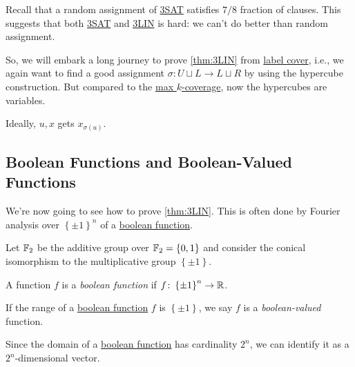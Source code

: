 \begin{note}
	Recall that a random assignment of \hyperref[prb:max-3SAT]{3SAT} satisfies \(7 / 8\) fraction of clauses. This suggests that both \hyperref[prb:max-3SAT]{3SAT} and \hyperref[prb:max-3LIN]{3LIN} is hard: we can't do better than random assignment.
\end{note}

So, we will embark a long journey to prove \autoref{thm:3LIN} from \hyperref[prb:label-cover]{label cover}, i.e., we again want to find a good assignment \(\sigma \colon U \sqcup L \to L \sqcup R\) by using the hypercube construction. But compared to the \hyperref[prb:max-k-coverage]{max \(k\)-coverage}, now the hypercubes are variables.

\begin{center}
\end{center}

Ideally, \(u, x\) gets \(x_{\sigma (u)}\).

\subsection{Boolean Functions and Boolean-Valued Functions}
We're now going to see how to prove \autoref{thm:3LIN}. This is often done by Fourier analysis over \(\left\{ \pm 1 \right\} ^n\) of a \hyperref[def:boolean-function]{boolean function}.

\begin{definition*}
	Let \(\mathbb{\MakeUppercase{f}} _2\) be the additive group over \(\mathbb{\MakeUppercase{f}} _2 = \left\{ 0, 1 \right\} \) and consider the conical isomorphism to the multiplicative group \(\left\{ \pm 1 \right\} \).
	\begin{definition}\label{def:boolean-function}
		A function \(f\) is a \emph{boolean function} if \(f\colon \left\{ \pm 1 \right\} ^n \to \mathbb{\MakeUppercase{r}} \).
	\end{definition}

	\begin{definition}\label{def:boolean-valued}
		If the range of a \hyperref[def:boolean-function]{boolean function} \(f\) is \(\left\{ \pm 1 \right\} \), we say \(f\) is a \emph{boolean-valued} function.
	\end{definition}
\end{definition*}

\begin{note}
	Since the domain of a \hyperref[def:boolean-function]{boolean function} has cardinality \(2^n\), we can identify it as a \(2^n\)-dimensional vector.
\end{note}


